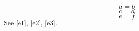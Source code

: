 \documentclass{article}
\begin{document}
\begin{equation}a=b\label{e1}\end{equation}
\begin{equation}c=d\nonumber\label{e2}\end{equation}
\begin{equation}e=f\label{e3}\end{equation}
See \ref{e1}, \ref{e2}, \ref{e3}.
\end{document}
